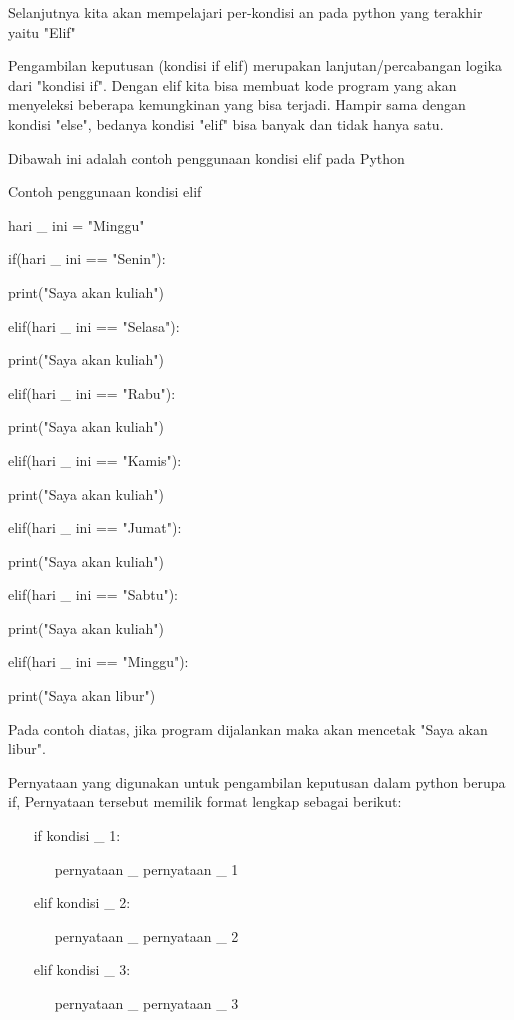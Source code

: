 Selanjutnya kita akan mempelajari per-kondisi an pada python yang terakhir yaitu "Elif"    

 
Pengambilan keputusan (kondisi if elif) merupakan lanjutan/percabangan logika dari "kondisi if". Dengan elif kita bisa membuat kode program yang akan menyeleksi beberapa kemungkinan yang bisa terjadi. Hampir sama dengan kondisi "else", bedanya kondisi "elif" bisa banyak dan tidak hanya satu.   

Dibawah ini adalah contoh penggunaan kondisi elif pada Python 

 
Contoh penggunaan kondisi elif 

 
hari   \_  ini = "Minggu" 
 


if(hari   \_  ini == "Senin"): 
 

        print("Saya akan kuliah") 
 

elif(hari   \_  ini == "Selasa"): 
 

        print("Saya akan kuliah") 
 

elif(hari   \_  ini == "Rabu"): 
 

        print("Saya akan kuliah") 
 

elif(hari   \_  ini == "Kamis"): 
 

        print("Saya akan kuliah") 
 

elif(hari   \_  ini == "Jumat"): 
 

        print("Saya akan kuliah") 
 

elif(hari   \_  ini == "Sabtu"): 
 

        print("Saya akan kuliah") 
 

elif(hari   \_  ini == "Minggu"): 
 

        print("Saya akan libur") 
 


Pada contoh diatas, jika program dijalankan maka akan mencetak   
"Saya akan libur". 
 
   Pernyataan yang digunakan untuk pengambilan keputusan dalam python berupa if, Pernyataan tersebut memilik format lengkap sebagai berikut: 

 
~~~ if kondisi   \_  1: 

 
~~~~~~ pernyataan   \_  pernyataan   \_  1 

 
~~~ elif kondisi   \_  2: 

 
~~~~~~ pernyataan   \_  pernyataan   \_  2 

 
~~~ elif kondisi   \_  3: 

 
~~~~~~ pernyataan   \_  pernyataan   \_  3 

